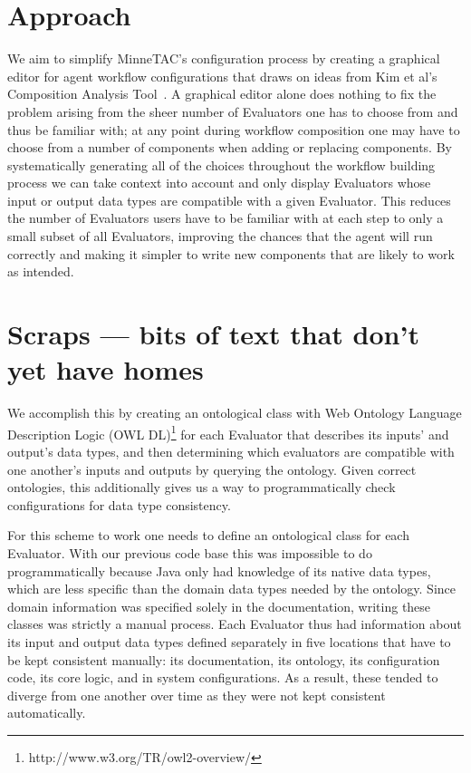 \documentclass{article}
\begin{document}

\section{Approach}

We aim to simplify MinneTAC's configuration
process by creating a graphical editor for agent workflow configurations that draws on ideas from Kim et al's Composition Analysis Tool~\cite{kim2004intelligent}.
A graphical editor alone does nothing to fix the problem arising
from the sheer number of Evaluators one has to choose from and thus
be familiar with; at any point during workflow composition one may have to choose from a number of components when adding or replacing components.
By systematically generating all of the choices throughout the workflow building process we can take context into account and only display Evaluators whose input or output data types are compatible with a given Evaluator.
This reduces the number of Evaluators users have to be familiar with at each step to only a small subset of all Evaluators, improving the chances that the agent will run correctly and making it simpler to write new components that are likely to work as intended.

\section{Scraps --- bits of text that don't yet have homes} %

We accomplish this by creating an ontological class with Web Ontology Language Description Logic (OWL DL)\footnote{http://www.w3.org/TR/owl2-overview/} for each Evaluator that describes its inputs' and output's data types, and then determining which evaluators are compatible with one another's inputs and outputs by querying the ontology.  Given correct ontologies, this additionally gives us a way to programmatically check configurations for data type consistency.

For this scheme to work one needs to define an ontological class for each Evaluator.  With our previous code base this was impossible to do programmatically because Java only had knowledge of its native data types, which are less specific than the domain data types needed by the ontology.  Since domain information was specified solely in the documentation, writing these classes was strictly a manual process.
Each Evaluator thus had information about its input and output data types defined separately in five locations that have to be kept consistent manually:  its documentation, its ontology, its configuration code, its core logic, and in system configurations.  As a result, these tended to diverge from one another over time as they were not kept consistent automatically.
\end{document}
